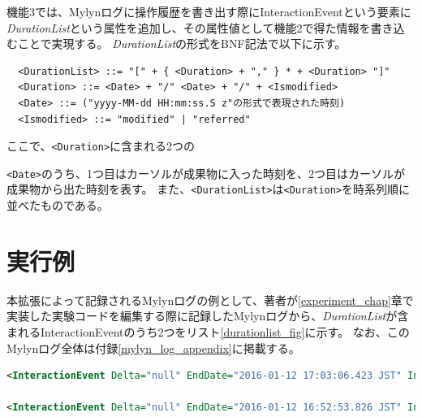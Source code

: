 \documentclass[a4paper]{jsbook}
\begin{document}
機能3では、Mylynログに操作履歴を書き出す際にInteractionEventという要素に{\it DurationList}という属性を追加し、その属性値として機能2で得た情報を書き込むことで実現する。
{\it DurationList}の形式をBNF記法で以下に示す。
\begin{verbatim}
  <DurationList> ::= "[" + { <Duration> + "," } * + <Duration> "]"
  <Duration> ::= <Date> + "/" <Date> + "/" + <Ismodified>
  <Date> ::= ("yyyy-MM-dd HH:mm:ss.S z"の形式で表現された時刻)
  <Ismodified> ::= "modified" | "referred"
\end{verbatim}
ここで、\texttt{<Duration>}に含まれる2つの{\texttt{<Date>}のうち、1つ目はカーソルが成果物に入った時刻を、2つ目はカーソルが成果物から出た時刻を表す。
また、\texttt{<DurationList>}は\texttt{<Duration>}を時系列順に並べたものである。
\section{実行例}
本拡張によって記録されるMylynログの例として、著者が\ref{experiment_chap}章で実装した実験コードを編集する際に記録したMylynログから、{\it DurationList}が含まれるInteractionEventのうち2つをリスト\ref{durationlist_fig}に示す。
なお、このMylynログ全体は付録\ref{mylyn_log_appendix}に掲載する。

\begin{lstlisting}[style=normalsize, language=xml, caption=拡張されたMylynによって記録されたMylynログの例（ただしXML上で実体参照に変換された文字はもとに戻している）, label=durationlist_fig]
<InteractionEvent Delta="null" EndDate="2016-01-12 17:03:06.423 JST" Interest="15.0" Kind="edit" Navigation="null" OriginId="org.eclipse.jdt.ui.CompilationUnitEditor" StartDate="2016-01-12 16:38:31.648 JST" StructureHandle="=MylynGitPrediction/src<tkobaya.yamamori.mgprediction.combine{MylynReaderResult.java[MylynReaderResult~ addInteractionSet~QMylynInteractionHistory;~D" StructureKind="java" NumEvents="15" CreationCount="103" DurationList= "[2016-01-12 16:38:31.648 JST/2016-01-12 16:40:16.482 JST/modified, 2016-01-12 17:02:58.409 JST/2016-01-12 17:03:06.423 JST/modified]"/>

<InteractionEvent Delta="null" EndDate="2016-01-12 16:52:53.826 JST" Interest="29.0" Kind="edit" Navigation="null" OriginId="org.eclipse.jdt.ui.CompilationUnitEditor" StartDate="2016-01-12 16:43:09.833 JST" StructureHandle="= MylynGitPrediction/src<tkobaya.yamamori.mgprediction.combine{SingleFileSet.java[SingleFileSet~putAll~QMap<+QInteger;+QDouble;>;" StructureKind="java" NumEvents="29" CreationCount="157" DurationList=" [2016-01-12 16:43:09.833 JST/2016-01-12 16:43:11.666 JST/referred, 2016-01-12 16:51:14.131 JST/2016-01-12 16:51:14.131 JST/referred, 2016-01-12 16:51:38.25 JST/2016-01-12 16:52:53.826 JST/modified]"/>
\end{lstlisting}

}
\end{document}
